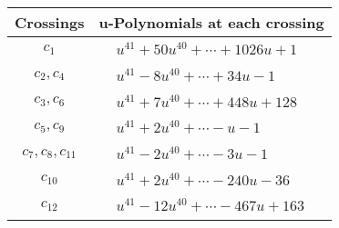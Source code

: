 \documentclass[1p]{elsarticle_modified}
\theoremstyle{definition}
\begin{document}
\begin{tabular}{m{50pt}|m{274pt}}
Crossings & \hspace{64pt}u-Polynomials at each crossing \\
\hline $$\begin{aligned}c_{1}\end{aligned}$$&$\begin{aligned}
&u^{41}+50 u^{40}+\cdots+1026 u+1
\end{aligned}$\\
\hline $$\begin{aligned}c_{2},c_{4}\end{aligned}$$&$\begin{aligned}
&u^{41}-8 u^{40}+\cdots+34 u-1
\end{aligned}$\\
\hline $$\begin{aligned}c_{3},c_{6}\end{aligned}$$&$\begin{aligned}
&u^{41}+7 u^{40}+\cdots+448 u+128
\end{aligned}$\\
\hline $$\begin{aligned}c_{5},c_{9}\end{aligned}$$&$\begin{aligned}
&u^{41}+2 u^{40}+\cdots- u-1
\end{aligned}$\\
\hline $$\begin{aligned}c_{7},c_{8},c_{11}\end{aligned}$$&$\begin{aligned}
&u^{41}-2 u^{40}+\cdots-3 u-1
\end{aligned}$\\
\hline $$\begin{aligned}c_{10}\end{aligned}$$&$\begin{aligned}
&u^{41}+2 u^{40}+\cdots-240 u-36
\end{aligned}$\\
\hline $$\begin{aligned}c_{12}\end{aligned}$$&$\begin{aligned}
&u^{41}-12 u^{40}+\cdots-467 u+163
\end{aligned}$\\
\hline
\end{tabular}\\~\\
\newpage\renewcommand{\arraystretch}{1}
\end{document}
